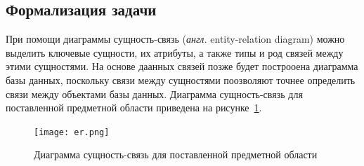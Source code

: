 \subsection{Формализация задачи}

При помощи диаграммы сущность-связь (\textit{англ.} entity-relation diagram) можно выделить ключевые сущности, их атрибуты, а также типы и род связей между этими сущностями.
На основе даанных связей позже будет построоена диаграмма базы данных, поскольку связи между сущностями поозволяют точнее определить связи между объектами базы данных.
Диаграмма сущность-связь для поставленной предметной области приведена на рисунке~\ref{fig:er}.

\begin{figure}[h!]
	\centering
	\captionsetup{justification=centering}
	\texttt{[image: er.png]}
	\caption{Диаграмма сущность-связь для поставленной предметной области}
	\label{fig:er}
\end{figure}


